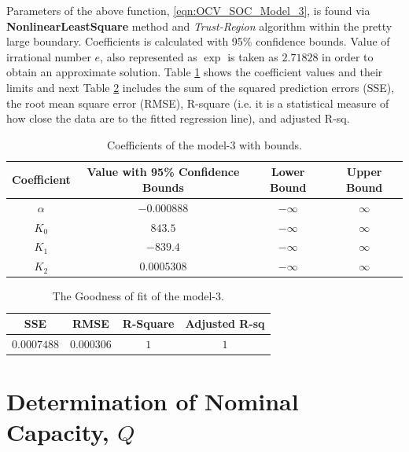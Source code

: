 \documentclass[12pt]{article}
\begin{document}
\begin{appendices}
\par \noindent Parameters of the above function, \ref{eqn:OCV_SOC_Model_3},  is found via \textbf{NonlinearLeastSquare} method and \textit{Trust-Region} algorithm within the pretty large boundary. Coefficients is calculated with 95\% confidence bounds. Value of irrational number $e$, also represented as $\exp$ is taken as $2.71828$ in order to obtain an approximate solution. Table \ref{table:OCV_SOC_Model_3_1} shows the coefficient values and their limits and next Table \ref{table:OCV_SOC_Model_3_2} includes the sum of the squared prediction errors (SSE), the root mean square error (RMSE), R-square (i.e. it is a statistical measure of how close the data are to the fitted regression line), and adjusted R-sq.
\vspace{-2mm}
\begin{table}[!h]
	\center
	\begin{tabular}{||c | c | c | c ||} 
		\hline
		Coefficient & Value with 95\% Confidence Bounds & Lower Bound & Upper Bound \\ [0.5ex] 
		\hline\hline
		$\alpha$ & $-0.000888$  & $-\infty$ & $\infty$ \\ 
		\hline
		$K_{0}$ & $843.5$ & $-\infty$ & $\infty$ \\
		\hline
		$K_{1}$ & $-839.4$ & $-\infty$ & $\infty$ \\
		\hline
		$K_{2}$ & $0.0005308$ & $-\infty$ & $\infty$ \\
		\hline
	\end{tabular}
	\caption{\label{table:OCV_SOC_Model_3_1}Coefficients of the model-3 with bounds.}
\end{table}

\begin{table}[!h]
	\center
	\begin{tabular}{||c | c | c | c ||} 
		\hline
		SSE & RMSE & R-Square & Adjusted R-sq\\ [0.5ex] 
		\hline\hline
		$0.0007488$ & $0.000306$  & $1$ & $1$ \\ 
		\hline
	\end{tabular}
	\caption{\label{table:OCV_SOC_Model_3_2}The Goodness of fit of the model-3.}
\end{table}

\section{Determination of Nominal Capacity, $Q$}
\label{Total_Capacity_Calculation}
 


\end{appendices}
\end{document}
